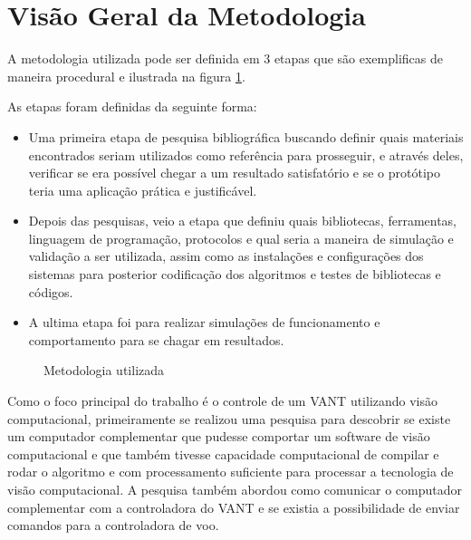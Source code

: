 
\section{Visão Geral da Metodologia}

A metodologia utilizada pode ser definida em 3 etapas que são exemplificas de maneira procedural e ilustrada na figura \ref{fig:diagmetpesq}. 

As etapas foram definidas da seguinte forma:

\begin{itemize}
	\item Uma primeira etapa de pesquisa bibliográfica buscando definir quais materiais encontrados seriam utilizados como referência para prosseguir, e através deles, verificar se era possível chegar a um resultado satisfatório e se o protótipo teria uma aplicação prática e justificável. 
	
	\item Depois das pesquisas, veio a etapa que definiu quais bibliotecas, ferramentas, linguagem de programação, protocolos e qual seria a maneira de simulação e validação a ser utilizada, assim como as instalações e configurações dos sistemas para posterior codificação dos algoritmos e testes de bibliotecas e códigos.
	
	\item A ultima etapa foi para realizar simulações de funcionamento e comportamento para se chagar em resultados.
\end{itemize}

\begin{figure}[H]
	\centering	
	\caption{Metodologia utilizada}
	\fontsize{9pt}{12pt}\selectfont
	\def\svgwidth{15cm}
	
	\label{fig:diagmetpesq}
\end{figure}

Como o foco principal do trabalho é o controle de um VANT utilizando visão computacional, primeiramente se realizou uma pesquisa para descobrir se existe um computador complementar que pudesse comportar um software de visão computacional e que também tivesse capacidade computacional de compilar e rodar o algoritmo e com processamento suficiente para processar a tecnologia de visão computacional. A pesquisa também abordou como comunicar o computador complementar com a controladora do VANT e se existia a possibilidade de enviar comandos para a controladora de voo. 

